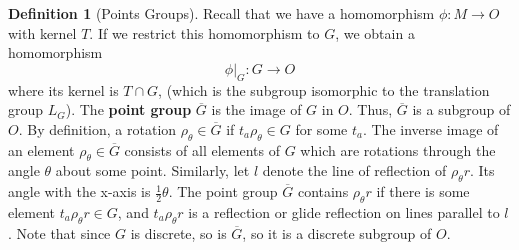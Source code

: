 \documentclass[12pt]{article}
\theoremstyle{definition}
\newtheorem{defn}[thm]{Definition}
\theoremstyle{remark}
\numberwithin{equation}{section}
\newcommand\B[1]{\textbf{ #1}}
\begin{document}
\begin{defn}[Points Groups]
        Recall that we have a homomorphism $\phi:M\rightarrow O$ with kernel $T$. If we restrict this homomorphism to $G$, we obtain a homomorphism \begin{equation}
                \phi\Big\vert_{G}:G \rightarrow O
        \end{equation}
        where its kernel is $T \cap G$, (which is the subgroup isomorphic to the translation group $L_G$). The \B{point group} $\overline{G}$ is the image of $G$ in $O$. Thus, $\overline{G}$ is a subgroup of $O$. By definition, a rotation $\rho_{\theta} \in \overline{G}$ if $t_a\rho_{\theta} \in G$ for some $t_a$. The inverse image of an element $\rho_{\theta} \in \overline{G}$ consists of all elements of $G$ which are rotations through the angle $\theta$ about some point. Similarly, let $l$ denote the line of reflection of $\rho_{\theta}r$. Its angle with the x-axis is $\frac{1}{2}\theta$. The point group $\overline{G}$ contains $\rho_{\theta}r$ if there is some element $t_a\rho_{\theta}r \in G$, and $t_a\rho_{\theta}r$ is a reflection or glide reflection on lines parallel to $l$. Note that since $G$ is discrete, so is $\overline{G}$, so it is a discrete subgroup of $O$.
\end{defn}

\vspace{15pt}
\end{document}
